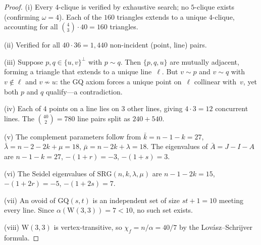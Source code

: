 \documentclass[12pt,a4paper]{article}
\newcommand{\W}{\mathrm{W}(3,3)}
\begin{document}
\begin{proof}
(i) Every $4$-clique is verified by exhaustive search; no $5$-clique exists
(confirming $\omega = 4$).  Each of the $160$ triangles extends to a unique
$4$-clique, accounting for all $\binom{4}{3} \cdot 40 = 160$ triangles.

(ii) Verified for all $40 \cdot 36 = 1{,}440$ non-incident (point, line) pairs.

(iii) Suppose $p, q \in \{u,v\}^{\!\perp}$ with $p \sim q$.
Then $\{p,q,u\}$ are mutually adjacent, forming a triangle that extends to a
unique line~$\ell$.  But $v \sim p$ and $v \sim q$ with $v \notin \ell$ and
$v \not\sim u$: the GQ axiom forces a unique point on~$\ell$ collinear
with~$v$, yet both $p$ and $q$ qualify---a contradiction.

(iv) Each of $4$ points on a line lies on $3$ other lines, giving
$4 \cdot 3 = 12$ concurrent lines.
The $\binom{40}{2} = 780$ line pairs split as $240 + 540$. %

(v) The complement parameters follow from
$\bar k = n{-}1{-}k = 27$,
$\bar\lambda = n{-}2{-}2k{+}\mu = 18$,
$\bar\mu = n{-}2k{+}\lambda = 18$.
The eigenvalues of $\bar A = J{-}I{-}A$ are
$n{-}1{-}k = 27$, $-(1{+}r) = -3$, $-(1{+}s) = 3$.

(vi) The Seidel eigenvalues of $\mathrm{SRG}(n,k,\lambda,\mu)$ are
$n{-}1{-}2k = 15$, $-(1{+}2r) = -5$, $-(1{+}2s) = 7$.

(vii) An ovoid of $\mathrm{GQ}(s,t)$ is an independent set of size
$st + 1 = 10$ meeting every line.
Since $\alpha(\W) = 7 < 10$, no such set exists.

(viii) $\W$ is vertex-transitive, so
$\chi_f = n / \alpha = 40/7$ by the Lov\'asz--Schrijver formula.
\end{proof}
\end{document}

